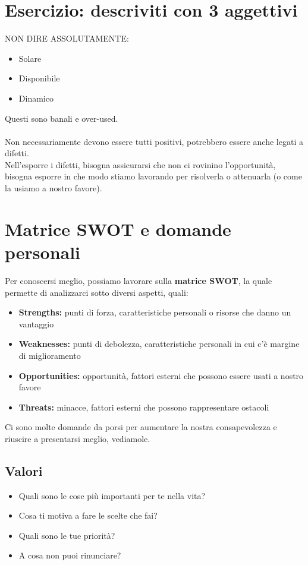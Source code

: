 \documentclass[12pt,a4paper]{article}
\let\oldsection\section
\renewcommand{\section}{\clearpage\oldsection}
\begin{document}
\section{Esercizio: descriviti con 3 aggettivi}
NON DIRE ASSOLUTAMENTE:
\begin{itemize}
  \item Solare
  \item Disponibile
  \item Dinamico
\end{itemize}
Questi sono banali e over-used.\\\\
Non necessariamente devono essere tutti positivi, potrebbero essere anche legati a difetti.\\
Nell'esporre i difetti, bisogna assicurarsi che non ci rovinino l'opportunità, bisogna esporre in che modo stiamo lavorando per risolverla o attenuarla (o come la usiamo a nostro favore).

\section{Matrice SWOT e domande personali}
Per conoscersi meglio, possiamo lavorare sulla \textbf{matrice SWOT}, la quale permette di analizzarci sotto diversi aspetti, quali:
\begin{itemize}
  \item \textbf{Strengths:} punti di forza, caratteristiche personali o risorse che danno un vantaggio
  \item \textbf{Weaknesses:} punti di debolezza, caratteristiche personali in cui c'è margine di miglioramento
  \item \textbf{Opportunities:} opportunità, fattori esterni che possono essere usati a nostro favore
  \item \textbf{Threats:} minacce, fattori esterni che possono rappresentare ostacoli
\end{itemize}
Ci sono molte domande da porsi per aumentare la nostra consapevolezza e riuscire a presentarsi meglio, vediamole.
\subsection{Valori}
\begin{itemize}
  \item Quali sono le cose più importanti per te nella vita?
  \item Cosa ti motiva a fare le scelte che fai?
  \item Quali sono le tue priorità?
  \item A cosa non puoi rinunciare?
\end{itemize}
\end{document}
